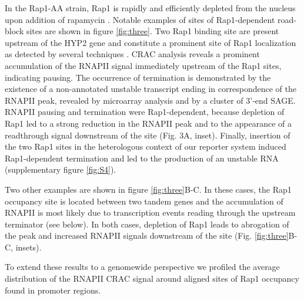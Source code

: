 In the Rap1-AA strain, Rap1 is rapidly and efficiently depleted from the nucleus upon addition of rapamycin \cite{haruki:2008:anchoraway}.  Notable examples of sites of Rap1-dependent road-block sites are shown in figure \ref{fig:three}. Two Rap1 binding site are present upstream of the HYP2 gene and constitute a prominent site of Rap1 localization as detected by several techniques \cite{rhee:2011:comprehensive, kubik:2015:nucleosome}. CRAC analysis reveals a prominent accumulation of the RNAPII signal immediately upstream of the Rap1 sites, indicating pausing. The occurrence of termination is demonstrated by the existence of a non-annotated unstable transcript ending in correspondence of the RNAPII peak, revealed by microarray analysis \cite{neil:2009:widespread} and by a cluster of 3’-end SAGE. RNAPII pausing and termination were Rap1-dependent, because depletion of Rap1 led to a strong reduction in the RNAPII peak and to the appearance of a readthrough signal downstream of the site (Fig. 3A, inset). Finally, insertion of the two Rap1 sites in the heterologous context of our reporter system induced Rap1-dependent termination and led to the production of an unstable RNA (supplementary figure \ref{fig:S4}).

Two other examples are shown in figure \ref{fig:three}B-C. In these cases, the Rap1 occupancy site is located between two tandem genes and the accumulation of RNAPII is most likely due to transcription events reading through the upstream terminator (see below). In both cases, depletion of Rap1 leads to abrogation of the peak and increased RNAPII signals downstream of the site (Fig. \ref{fig:three}B-C, insets). 

To extend these results to a genomewide perspective we profiled the average distribution of the RNAPII CRAC signal around aligned sites of Rap1 occupancy found in promoter regions.

